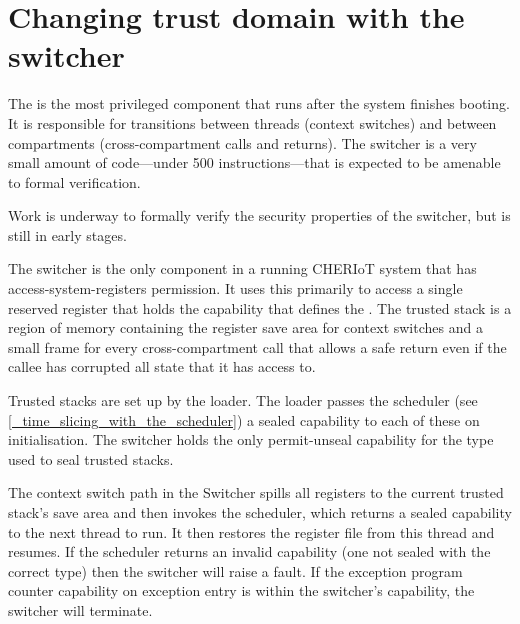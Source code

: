 \section{Changing trust domain with the switcher}

The  is the most privileged component that runs after the system finishes booting.
It is responsible for transitions between threads (context switches) and between compartments (cross-compartment calls and returns).
The switcher is a very small amount of code—under 500 instructions—that is expected to be amenable to formal verification.

\begin{note}
Work is underway to formally verify the security properties of the switcher, but is still in early stages.
\end{note}

The switcher is the only component in a running CHERIoT system that has access-system-registers permission.
It uses this primarily to access a single reserved register that holds the capability that defines the .
The trusted stack is a region of memory containing the register save area for context switches and a small frame for every cross-compartment call that allows a safe return even if the callee has corrupted all state that it has access to.

Trusted stacks are set up by the loader.
The loader passes the scheduler (see \ref{_time_slicing_with_the_scheduler}) a sealed capability to each of these on initialisation.
The switcher holds the only permit-unseal capability for the type used to seal trusted stacks.

The context switch path in the Switcher spills all registers to the current trusted stack's save area and then invokes the scheduler, which returns a sealed capability to the next thread to run.
It then restores the register file from this thread and resumes.
If the scheduler returns an invalid capability (one not sealed with the correct type) then the switcher will raise a fault.
If the exception program counter capability on exception entry is within the switcher's capability, the switcher will terminate.

